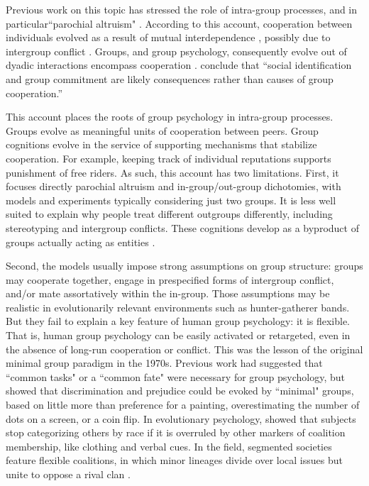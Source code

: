 \documentclass[12pt,a4paper]{article}
\begin{document}
Previous work on this topic has stressed the role of intra-group processes, and in particular``parochial altruism" \parencite{dedreu2014parochial,aaldering2018parochial,rusch2016parochial,yamagishi2016parochial}. According to this account, cooperation between individuals evolved as a result of mutual interdependence \parencite{balliet2017functional,aktipis2018understanding,roberts2005cooperation}, possibly due to intergroup conflict \parencite{garcia2011evolution,pisor2023parochial,rusch2014evolutionary}. 
Groups, and group psychology, consequently evolve out of dyadic interactions encompass cooperation \parencite{tooby2006cognitive,kiyonari2004ingroup,yamagishi2000thegroup}. \textcite{dedreu2023group} conclude that ``social identification and group commitment are likely consequences rather than causes of group cooperation.''

This account places the roots of group psychology in intra-group processes. Groups evolve as meaningful units of cooperation between peers. Group cognitions evolve in the service of supporting mechanisms that stabilize cooperation. For example, keeping track of individual reputations supports punishment of free riders. 
As such, this account has two limitations. First, it focuses directly parochial altruism and in-group/out-group dichotomies, with models and experiments typically considering just two groups. It is less well suited to explain why people treat different outgroups differently, including stereotyping and intergroup conflicts. These cognitions develop as a byproduct of groups actually acting as entities \parencite{tooby2010groups}.



Second, the models usually impose strong assumptions on group structure: groups may cooperate together, engage in prespecified forms of intergroup conflict, and/or mate assortatively within the in-group. Those assumptions may be realistic in evolutionarily relevant environments such as hunter-gatherer bands. But they fail to explain a key feature of human group psychology: it is flexible. That is, human group psychology can be easily activated or retargeted, even in the absence of long-run cooperation or conflict. This was the lesson of the original minimal group paradigm in the 1970s. Previous work had suggested that ``common tasks" or a ``common fate" were necessary for group psychology, but \cite{tajfel1971social} showed that discrimination and prejudice could be evoked by ``minimal" groups, based on little more than preference for a painting, overestimating the number of dots on a screen, or a coin flip. In evolutionary psychology, \cite{kurzban2001can} showed that subjects stop categorizing others by race if it is overruled by other markers of coalition membership, like clothing and verbal cues. In the field, segmented societies feature flexible coalitions, in which minor lineages divide over local issues but unite to oppose a rival clan \parencite{fortes2015african}.
\end{document}
